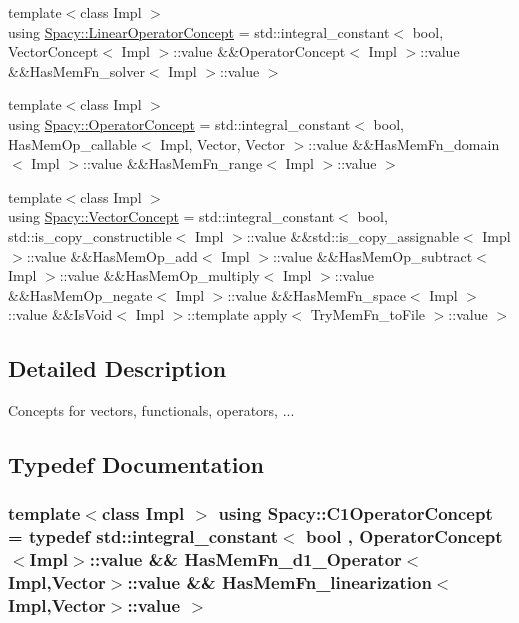 \begin{DoxyCompactItemize}
{\footnotesize template$<$class Impl $>$ }\\using \hyperlink{group__ConceptGroup_ga8d3bdfc9abd844ab446a31fcd3f8ef8c}{Spacy\+::\+Linear\+Operator\+Concept} = std\+::integral\+\_\+constant$<$ bool, Vector\+Concept$<$ Impl $>$\+::value \&\&Operator\+Concept$<$ Impl $>$\+::value \&\&Has\+Mem\+Fn\+\_\+solver$<$ Impl $>$\+::value $>$
\item 
{\footnotesize template$<$class Impl $>$ }\\using \hyperlink{group__ConceptGroup_ga0cd6ba53feff75abbb6822b45fd6265e}{Spacy\+::\+Operator\+Concept} = std\+::integral\+\_\+constant$<$ bool, Has\+Mem\+Op\+\_\+callable$<$ Impl, Vector, Vector $>$\+::value \&\&Has\+Mem\+Fn\+\_\+domain$<$ Impl $>$\+::value \&\&Has\+Mem\+Fn\+\_\+range$<$ Impl $>$\+::value $>$
\item 
{\footnotesize template$<$class Impl $>$ }\\using \hyperlink{group__ConceptGroup_gac8fbeed0f838941e90ebe635a546e1db}{Spacy\+::\+Vector\+Concept} = std\+::integral\+\_\+constant$<$ bool, std\+::is\+\_\+copy\+\_\+constructible$<$ Impl $>$\+::value \&\&std\+::is\+\_\+copy\+\_\+assignable$<$ Impl $>$\+::value \&\&Has\+Mem\+Op\+\_\+add$<$ Impl $>$\+::value \&\&Has\+Mem\+Op\+\_\+subtract$<$ Impl $>$\+::value \&\&Has\+Mem\+Op\+\_\+multiply$<$ Impl $>$\+::value \&\&Has\+Mem\+Op\+\_\+negate$<$ Impl $>$\+::value \&\&Has\+Mem\+Fn\+\_\+space$<$ Impl $>$\+::value \&\&Is\+Void$<$ Impl $>$\+::template apply$<$ Try\+Mem\+Fn\+\_\+to\+File $>$\+::value $>$
\end{DoxyCompactItemize}


\subsection{Detailed Description}
Concepts for vectors, functionals, operators, ... 



\subsection{Typedef Documentation}
\hypertarget{group__ConceptGroup_ga61ea9fe1d23e9f45e4e5fe940fe0e0cb}{}
\subsubsection[{C1\+Operator\+Concept}]{\setlength{\rightskip}{0pt plus 5cm}template$<$class Impl $>$ using {\bf Spacy\+::\+C1\+Operator\+Concept} = typedef std\+::integral\+\_\+constant$<$ bool , Operator\+Concept$<$Impl$>$\+::value \&\& Has\+Mem\+Fn\+\_\+d1\+\_\+\+Operator$<$Impl,Vector$>$\+::value \&\& Has\+Mem\+Fn\+\_\+linearization$<$Impl,Vector$>$\+::value $>$}\label{group__ConceptGroup_ga61ea9fe1d23e9f45e4e5fe940fe0e0cb}
\label{group__ConceptGroup_C1OperatorConceptAnchor}%
\hypertarget{group__ConceptGroup_C1OperatorConceptAnchor}{}%
 
